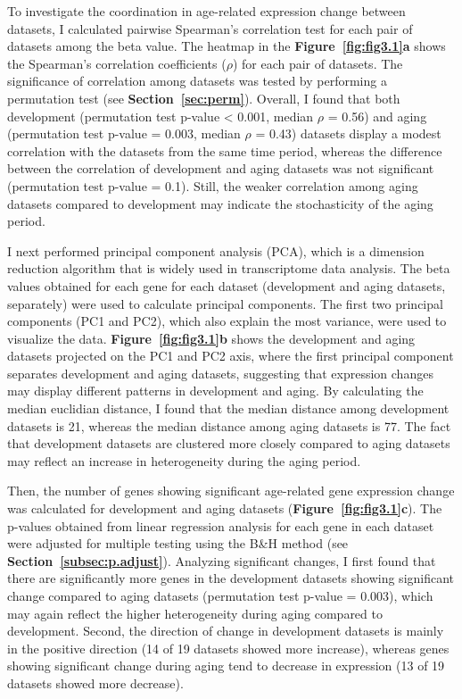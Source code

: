 To investigate the coordination in age-related expression change between datasets, 
I calculated pairwise Spearman's correlation test for each pair of datasets among the beta value.
The heatmap in the \textbf{Figure~\ref{fig:fig3.1}a} shows the Spearman's correlation coefficients ($\rho$) for each pair of datasets.
The significance of correlation among datasets was tested by performing a permutation test (see \textbf{Section~\ref{sec:perm}}).
Overall, I found that both development (permutation test p-value < 0.001, median $\rho$ = 0.56) and aging (permutation test p-value = 0.003, median $\rho$ = 0.43)
datasets display a modest correlation with the datasets from the same time period, 
whereas the difference between the correlation of development and aging datasets was not significant (permutation test p-value = 0.1).
Still, the weaker correlation among aging datasets compared to development may indicate the stochasticity of the aging period.

I next performed principal component analysis (PCA), which is a dimension reduction algorithm that is widely used in transcriptome data analysis. 
The beta values obtained for each gene for each dataset (development and aging datasets, separately) were used to calculate principal components.
The first two principal components (PC1 and PC2), which also explain the most variance, were used to visualize the data.
\textbf{Figure~\ref{fig:fig3.1}b} shows the development and aging datasets projected on the PC1 and PC2 axis, where
the first principal component separates development and aging datasets, suggesting that expression changes may display different patterns in development and aging.
By calculating the median euclidian distance, I found that the median distance among development datasets is 21, 
whereas the median distance among aging datasets is 77. 
The fact that development datasets are clustered more closely compared to aging datasets may reflect an increase in heterogeneity during the aging period.

Then, the number of genes showing significant age-related gene expression change was calculated for development and aging datasets (\textbf{Figure~\ref{fig:fig3.1}c}).
The p-values obtained from linear regression analysis for each gene in each dataset were adjusted for multiple testing using the B{\&}H method (see \textbf{Section~\ref{subsec:p.adjust}}).
Analyzing significant changes, I first found that there are significantly more genes in the development datasets showing significant change compared to aging datasets (permutation test p-value = 0.003),
which may again reflect the higher heterogeneity during aging compared to development.
Second, the direction of change in development datasets is mainly in the positive direction (14 of 19 datasets showed more increase), 
whereas genes showing significant change during aging tend to decrease in expression (13 of 19 datasets showed more decrease).

